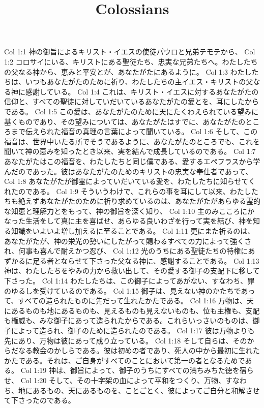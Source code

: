 

\title{Colossians}

Col 1:1  神の御旨によるキリスト・イエスの使徒パウロと兄弟テモテから、
Col 1:2  コロサイにいる、キリストにある聖徒たち、忠実な兄弟たちへ。わたしたちの父なる神から、恵みと平安とが、あなたがたにあるように。
Col 1:3  わたしたちは、いつもあなたがたのために祈り、わたしたちの主イエス・キリストの父なる神に感謝している。
Col 1:4  これは、キリスト・イエスに対するあなたがたの信仰と、すべての聖徒に対していだいているあなたがたの愛とを、耳にしたからである。
Col 1:5  この愛は、あなたがたのために天にたくわえられている望みに基くものであり、その望みについては、あなたがたはすでに、あなたがたのところまで伝えられた福音の真理の言葉によって聞いている。
Col 1:6  そして、この福音は、世界中いたる所でそうであるように、あなたがたのところでも、これを聞いて神の恵みを知ったとき以来、実を結んで成長しているのである。
Col 1:7  あなたがたはこの福音を、わたしたちと同じ僕である、愛するエペフラスから学んだのであった。彼はあなたがたのためのキリストの忠実な奉仕者であって、
Col 1:8  あなたがたが御霊によっていだいている愛を、わたしたちに知らせてくれたのである。
Col 1:9  そういうわけで、これらの事を耳にして以来、わたしたちも絶えずあなたがたのために祈り求めているのは、あなたがたがあらゆる霊的な知恵と理解力とをもって、神の御旨を深く知り、
Col 1:10  主のみこころにかなった生活をして真に主を喜ばせ、あらゆる良いわざを行って実を結び、神を知る知識をいよいよ増し加えるに至ることである。
Col 1:11  更にまた祈るのは、あなたがたが、神の栄光の勢いにしたがって賜わるすべての力によって強くされ、何事も喜んで耐えかつ忍び、
Col 1:12  光のうちにある聖徒たちの特権にあずかるに足る者とならせて下さった父なる神に、感謝することである。
Col 1:13  神は、わたしたちをやみの力から救い出して、その愛する御子の支配下に移して下さった。
Col 1:14  わたしたちは、この御子によってあがない、すなわち、罪のゆるしを受けているのである。
Col 1:15  御子は、見えない神のかたちであって、すべての造られたものに先だって生れたかたである。
Col 1:16  万物は、天にあるものも地にあるものも、見えるものも見えないものも、位も主権も、支配も権威も、みな御子にあって造られたからである。これらいっさいのものは、御子によって造られ、御子のために造られたのである。
Col 1:17  彼は万物よりも先にあり、万物は彼にあって成り立っている。
Col 1:18  そして自らは、そのからだなる教会のかしらである。彼は初めの者であり、死人の中から最初に生れたかたである。それは、ご自身がすべてのことにおいて第一の者となるためである。
Col 1:19  神は、御旨によって、御子のうちにすべての満ちみちた徳を宿らせ、
Col 1:20  そして、その十字架の血によって平和をつくり、万物、すなわち、地にあるもの、天にあるものを、ことごとく、彼によってご自分と和解させて下さったのである。
